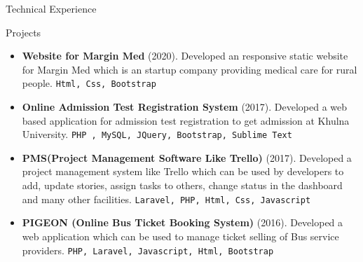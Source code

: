 \documentclass[]{mcdowellcv}
\begin{document}
	
	\begin{cvsection}{Technical Experience}
		\begin{cvsubsection}{Projects}{}{}
			\begin{itemize}
			    \item \textbf{Website for Margin Med} (2020).
			    Developed an responsive static website for Margin Med which is an startup company providing medical care for rural people. \texttt{Html, Css, Bootstrap} \href{https://marginmed.com/#}{\faExternalLink}
			
			  	\item \textbf{Online Admission Test Registration System} (2017). 
				Developed a web based application for admission test registration to get admission at Khulna University. \texttt{PHP , MySQL, JQuery, Bootstrap, Sublime Text}
				\item \textbf{PMS(Project Management Software Like Trello)} (2017). Developed a project management system like Trello which can be used by developers to add, update stories, assign tasks to others, change status in the dashboard and many other facilities.  \texttt{Laravel, PHP, Html, Css, Javascript}
				\item \textbf{PIGEON (Online Bus Ticket Booking System)} (2016). Developed a web application which can be used to manage ticket selling of Bus service providers. \texttt{PHP, Laravel, Javascript, Html, Bootstrap}
				
				
			\end{itemize}
		\end{cvsubsection}
	\end{cvsection}
	
	
		
\end{document}
